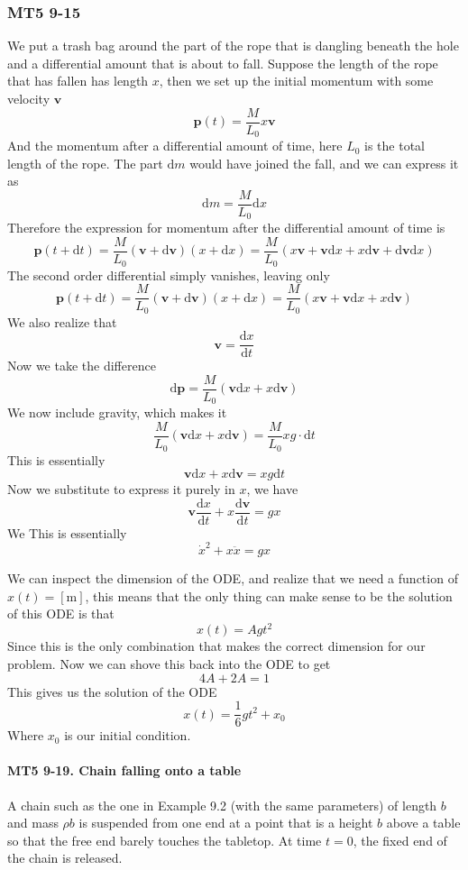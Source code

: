 \documentclass[11pt,letterpaper]{article}
\newcommand{\dydx}[2]{\frac{\text{d} #1}{\text{d} #2}}
\newcommand{\sqbkt}[1]{\left[ #1 \right]}
\newcommand{\paren}[1]{\left( #1 \right)}
\newcommand{\dfl}{\text{d}}
\begin{document}
\subsubsection{MT5 9-15}
We put a trash bag around the part of the rope that is dangling beneath the hole and a differential amount that is about to fall. Suppose the length of the rope that has fallen has length $x$, then we set up the initial momentum with some velocity $\mathbf{v}$
\[
\mathbf{p}(t) = \frac{M}{L_0}x\mathbf{v}
\]
And the momentum after a differential amount of time, here $L_0$ is the total length of the rope. The part $\dfl m$ would have joined the fall, and we can express it as
\[
\dfl m = \frac{M}{L_0}\dfl x
\]
Therefore the expression for momentum after the differential amount of time is
\[
\mathbf{p}(t+\dfl t) = \frac{M}{L_0}\paren{\mathbf{v} + \dfl \mathbf{v}}\paren{x + \dfl x} = \frac{M}{L_0}\paren{x\mathbf{v} + \mathbf{v}\dfl x + x\dfl \mathbf{v} + \dfl \mathbf{v}\dfl x}
\]
The second order differential simply vanishes, leaving only
\[
\mathbf{p}(t+\dfl t) = \frac{M}{L_0}\paren{\mathbf{v} + \dfl \mathbf{v}}\paren{x + \dfl x} = \frac{M}{L_0}\paren{x\mathbf{v} + \mathbf{v}\dfl x + x\dfl \mathbf{v}}
\]
We also realize that
\[
\mathbf{v} = \dydx{x}{t}
\]
Now we take the difference
\[
\dfl \mathbf{p} = \frac{M}{L_0}\paren{\mathbf{v}\dfl x  + x\dfl\mathbf{v}}
\]
We now include gravity, which makes it
\[
\frac{M}{L_0}\paren{\mathbf{v}\dfl x  + x\dfl\mathbf{v}} = \frac{M}{L_0}xg\cdot\dfl t
\]
This is essentially
\[
\mathbf{v}\dfl x  + x\dfl\mathbf{v} = xg\dfl t
\]
Now we substitute to express it purely in $x$, we have
\[
\mathbf{v}\dydx{x}{t} + x\dydx{\mathbf{v}}{t} = gx
\]
We This is essentially
\[
\dot{x}^2 + x\ddot{x} = gx
\]

We can inspect the dimension of the ODE, and realize that we need a function of $x(t) = \sqbkt{\text{m}}$, this means that the only thing can make sense to be the solution of this ODE is that
\[
x(t) = Agt^2
\]
Since this is the only combination that makes the correct dimension for our problem. Now we can shove this back into the ODE to get
\[
4A + 2A = 1
\]
This gives us the solution of the ODE
\[
x(t) = \frac{1}{6}gt^2 + x_0
\]
Where $x_0$ is our initial condition. 


\paragraph{MT5 9-19. Chain falling onto a table}
A chain such as the one in Example 9.2 (with the same parameters) of length $b$ and mass $\rho b$ is suspended from one end at a point that is a height $b$ above a table so that the free end barely touches the tabletop. At time $t = 0$, the fixed end of the chain is released. 
\end{document}
